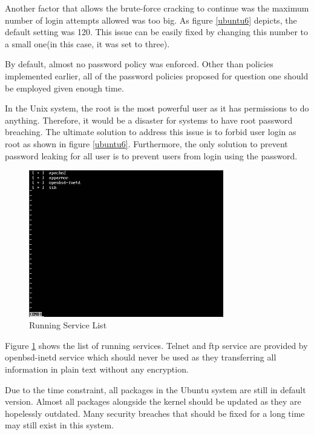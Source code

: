 \documentclass{article}
\begin{document}
Another factor that allows the brute-force cracking to continue was the maximum number of login attempts allowed 
was too big. As figure \ref{ubuntu6} depicts, the default setting was 120. This issue can be easily fixed by changing 
this number to a small one(in this case, it was set to three).

By default, almost no password policy was enforced. Other than policies implemented earlier, all of the password policies 
proposed for question one should be employed given enough time.

In the Unix system, the root is the most powerful user as it has permissions to do anything. Therefore, it would be a disaster for 
systems to have root password breaching. The ultimate solution to address this issue is to forbid user login as root 
as shown in figure \ref{ubuntu6}. Furthermore, the only solution to prevent password leaking for all user is to 
prevent users from login using the password.

\begin{figure}[H]
  \includegraphics[width=8.5cm]{ubuntu3}
  \caption{Running Service List}
  \label{ubuntu3}
\end{figure}
Figure \ref{ubuntu3} shows the list of running services. Telnet and ftp service are provided by openbsd-inetd service 
which should never be used as they transferring all information in plain text without any encryption.

Due to the time constraint, all packages in the Ubuntu system are still in default version. Almost all packages 
alongside the kernel should be updated as they are hopelessly outdated. Many security breaches that should be fixed 
for a long time may still exist in this system.


\vfill
\pagebreak

\vfill
\pagebreak



\end{document}
